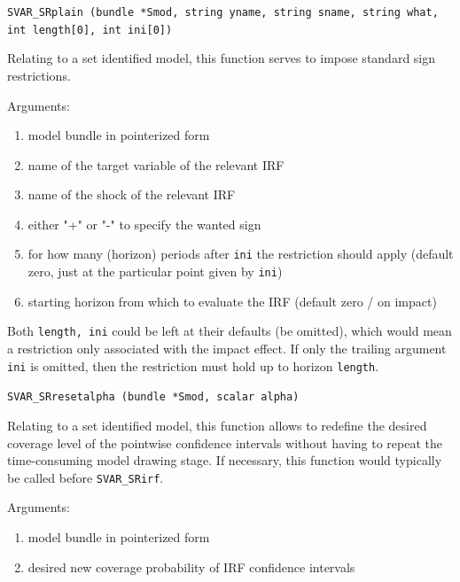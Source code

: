 \documentclass[a4paper,10pt]{article}
\newenvironment{funcdoc}[1]
{\noindent\hrulefill\newline\nopagebreak\texttt{#1}%
\nopagebreak\par\noindent\hrulefill%
\nopagebreak\par\nopagebreak\smallskip\nopagebreak\par}
{\bigskip}
\begin{document}
\begin{funcdoc}{SVAR\_SRplain (bundle *Smod, string yname, string sname, string what, \\
int length[0], int ini[0])}
\noindent Relating to a set identified model, this function serves to impose standard 
 sign restrictions.
 
 \noindent Arguments:
 
 \begin{enumerate}
 \item model bundle in pointerized form
 \item name of the target variable of the relevant IRF
 \item name of the shock of the relevant IRF
 \item either "+" or "-" to specify the wanted sign
 \item for how many (horizon) periods after \texttt{ini} the restriction should apply (default zero, 
   just at the particular point given by \texttt{ini})
 \item starting horizon from which to evaluate the IRF (default zero / on impact)
 \end{enumerate}
  Both \texttt{length, ini} could be left at their defaults 
  (be omitted), which would mean a restriction only associated with the impact effect. If only the 
  trailing argument \texttt{ini} is omitted, then the restriction must hold up to horizon \texttt{length}.
  \end{funcdoc}

\begin{funcdoc}{SVAR\_SRresetalpha (bundle *Smod, scalar alpha)}
\noindent Relating to a set identified model, this function allows to redefine the 
desired coverage level of the pointwise confidence intervals without having to 
repeat the time-consuming model drawing stage. If necessary, this function would
typically be called before \texttt{SVAR\_SRirf}. 

\noindent Arguments:
 
 \begin{enumerate}
 \item model bundle in pointerized form
 \item desired new coverage probability of IRF confidence intervals 
\end{enumerate}

\end{funcdoc}

\end{document}
